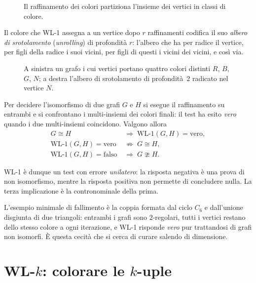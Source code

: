 \begin{figure}[H]
  \centering
  
  \caption{Il raffinamento dei colori partiziona l'insieme dei vertici in classi di
  colore.}
  \label{fig:wl1-partizione}
\end{figure}

Il colore che WL-1 assegna a un vertice dopo $r$ raffinamenti codifica il suo
\emph{albero di srotolamento} (\emph{unrolling}) di profondità $r$: l'albero che ha per
radice il vertice, per figli della radice i suoi vicini, per figli di questi i vicini
dei vicini, e così via.

\begin{figure}[H]
  \centering
  
  \caption{A sinistra un grafo i cui vertici portano quattro colori distinti $R$, $B$,
  $G$, $N$; a destra l'albero di srotolamento di profondità~$2$ radicato nel vertice
  $N$.}
  \label{fig:wl1-unrolling}
\end{figure}

Per decidere l'isomorfismo di due grafi $G$ e $H$ si esegue il raffinamento su entrambi
e si confrontano i multi-insiemi dei colori finali: il test ha esito \emph{vero} quando
i due multi-insiemi coincidono. Valgono allora
\begin{align*}
  G \cong H &\;\Longrightarrow\; \mathrm{WL}\text{-}1(G,H) = \text{vero},\\
  \mathrm{WL}\text{-}1(G,H) = \text{vero} &\;\nRightarrow\; G \cong H,\\
  \mathrm{WL}\text{-}1(G,H) = \text{falso} &\;\Longrightarrow\; G \ncong H.
\end{align*}

\begin{osservazione}
  WL-1 è dunque un test con errore \emph{unilatero}: la risposta negativa è una prova di
  non isomorfismo, mentre la risposta positiva non permette di concludere nulla. La
  terza implicazione è la contronominale della prima.
\end{osservazione}

L'esempio minimale di fallimento è la coppia formata dal ciclo $C_6$ e dall'unione
disgiunta di due triangoli: entrambi i grafi sono $2$-regolari, tutti i vertici restano
dello stesso colore a ogni iterazione, e WL-1 risponde \emph{vero} pur trattandosi di
grafi non isomorfi. È questa cecità che si cerca di curare salendo di dimensione.

\section{WL-\texorpdfstring{$k$}{k}: colorare le \texorpdfstring{$k$}{k}-uple}

